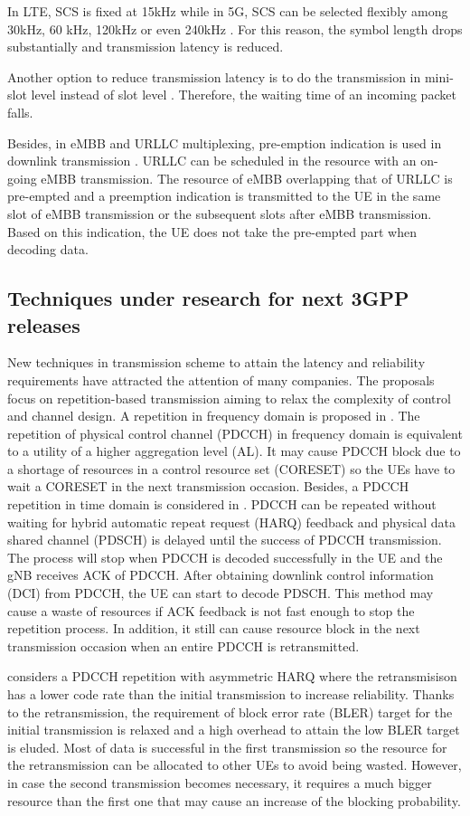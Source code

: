 \documentclass[conference]{IEEEtran}
\begin{document}
In LTE, SCS is fixed at 15kHz while in 5G, SCS can be selected flexibly among 30kHz, 60 kHz, 120kHz or even 240kHz \cite{ad2}. For this reason, the symbol length drops substantially and transmission latency is reduced.

Another option to reduce transmission latency is to do the transmission in mini-slot level instead of slot level \cite{ad3}. Therefore, the waiting time of an incoming packet falls.

Besides, in eMBB and URLLC multiplexing, pre-emption indication is used in downlink transmission \cite{ad4}. URLLC can be scheduled in the resource with an on-going eMBB transmission. The resource of eMBB overlapping that of URLLC is pre-empted and a preemption indication is transmitted to the UE in the same slot of eMBB transmission or the subsequent slots after eMBB transmission. Based on this indication, the UE does not take the pre-empted part when decoding data.

\subsection{Techniques under research for next 3GPP releases}\label{IBB}
New techniques in transmission scheme to attain the latency and reliability requirements have attracted the attention of many companies. The proposals focus on repetition-based transmission aiming to relax the complexity of control and channel design. A repetition in frequency domain is proposed in \cite{b1}. The repetition of physical control channel (PDCCH) in frequency domain is equivalent to a utility of a higher aggregation level (AL). It may cause PDCCH block due to a shortage of resources in a control resource set (CORESET) so the UEs have to wait a CORESET in the next transmission occasion. Besides, a PDCCH repetition in time domain is considered in \cite{b2}. PDCCH can be repeated without waiting for hybrid automatic repeat request (HARQ) feedback and physical data shared channel (PDSCH) is delayed until the success of PDCCH transmission. The process will stop when PDCCH is decoded successfully in the UE and the gNB receives ACK of PDCCH. After obtaining downlink control information (DCI) from PDCCH, the UE can start to decode PDSCH. This method may cause a waste of resources if ACK feedback is not fast enough to stop the repetition process. In addition, it still can cause resource block in the next transmission occasion when an entire PDCCH is retransmitted.  

\cite{b3} considers a PDCCH repetition with asymmetric HARQ where the retransmisison has a lower code rate than the initial transmission to increase reliability. Thanks to the retransmission, the requirement of block error rate (BLER) target for the initial transmission is relaxed and a high overhead to attain the low BLER target is eluded. Most of data is successful in the first transmission so the resource for the retransmission can be allocated to other UEs to avoid being wasted. However, in case the second transmission becomes necessary, it requires a much bigger resource than the first one that may cause an increase of the blocking probability.
\end{document}
